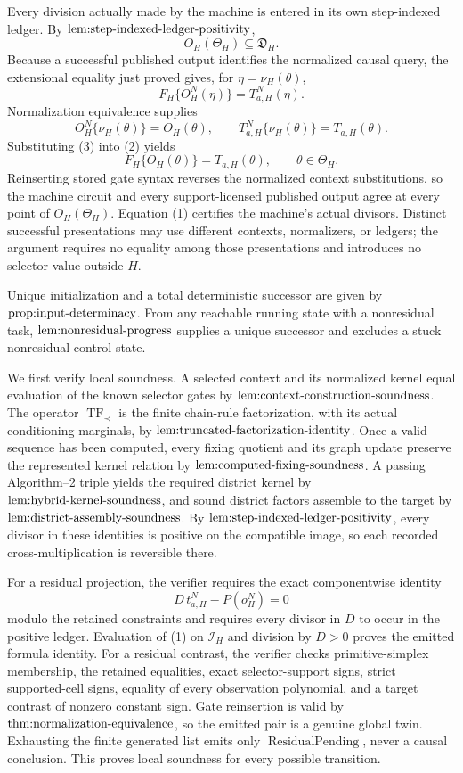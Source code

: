 Every division actually made by the machine is entered in its own step-indexed ledger.  By \(\textnormal{lem:step-indexed-ledger-positivity}\),
\[
 O_H(\Theta_H)\subseteq\mathfrak D_H.
\tag{1}
\]
Because a successful published output identifies the normalized causal query, the extensional equality just proved gives, for \(\eta=\nu_H(\theta)\),
\[
 F_H\{O_H^N(\eta)\}=T_{a,H}^N(\eta).
\tag{2}
\]
Normalization equivalence supplies
\[
 O_H^N\{\nu_H(\theta)\}=O_H(\theta),
 \qquad
 T_{a,H}^N\{\nu_H(\theta)\}=T_{a,H}(\theta).
\tag{3}
\]
Substituting (3) into (2) yields
\[
 F_H\{O_H(\theta)\}=T_{a,H}(\theta),
 \qquad \theta\in\Theta_H.
\tag{4}
\]
Reinserting stored gate syntax reverses the normalized context substitutions, so the machine circuit and every support-licensed published output agree at every point of \(O_H(\Theta_H)\).  Equation (1) certifies the machine's actual divisors.  Distinct successful presentations may use different contexts, normalizers, or ledgers; the argument requires no equality among those presentations and introduces no selector value outside \(H\).

Unique initialization and a total deterministic successor are given by \(\textnormal{prop:input-determinacy}\).  From any reachable running state with a nonresidual task, \(\textnormal{lem:nonresidual-progress}\) supplies a unique successor and excludes a stuck nonresidual control state.

We first verify local soundness.  A selected context and its normalized kernel equal evaluation of the known selector gates by \(\textnormal{lem:context-construction-soundness}\).  The operator \(\operatorname{TF}_{\prec}\) is the finite chain-rule factorization, with its actual conditioning marginals, by \(\textnormal{lem:truncated-factorization-identity}\).  Once a valid sequence has been computed, every fixing quotient and its graph update preserve the represented kernel relation by \(\textnormal{lem:computed-fixing-soundness}\).  A passing Algorithm--2 triple yields the required district kernel by \(\textnormal{lem:hybrid-kernel-soundness}\), and sound district factors assemble to the target by \(\textnormal{lem:district-assembly-soundness}\).  By \(\textnormal{lem:step-indexed-ledger-positivity}\), every divisor in these identities is positive on the compatible image, so each recorded cross-multiplication is reversible there.

For a residual projection, the verifier requires the exact componentwise identity
\[
 D\,t_{a,H}^N-P(o_H^N)=0
\tag{1}
\]
modulo the retained constraints and requires every divisor in \(D\) to occur in the positive ledger.  Evaluation of (1) on \(\mathcal I_H\) and division by \(D>0\) proves the emitted formula identity.  For a residual contrast, the verifier checks primitive-simplex membership, the retained equalities, exact selector-support signs, strict supported-cell signs, equality of every observation polynomial, and a target contrast of nonzero constant sign.  Gate reinsertion is valid by \(\textnormal{thm:normalization-equivalence}\), so the emitted pair is a genuine global twin.  Exhausting the finite generated list emits only \(\operatorname{ResidualPending}\), never a causal conclusion.  This proves local soundness for every possible transition.

